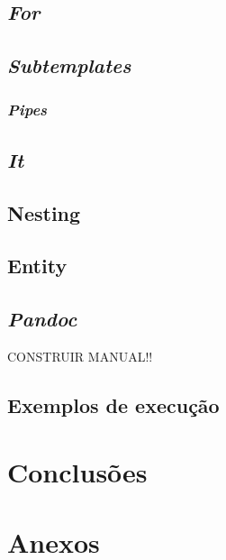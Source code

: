 \documentclass[11pt]{report}
\begin{document}
\section{\textit{For}}\label{subsec:For}


\section{\textit{Subtemplates}} \label{subsec:subt}


\subsection{\textit{Pipes}} \label{subsec:pipes}


\section{\textit{It}}\label{subsec:it}


\section{Nesting}
 \label{subsec:nest}

\section{Entity}
 \label{subsec:entity}

\section{\textit{Pandoc}}
CONSTRUIR MANUAL!!

\section{Exemplos de execução}

\chapter{Conclusões}



\chapter{Anexos}\label{sec:anexos}
\end{document}
